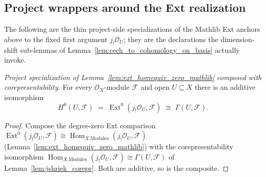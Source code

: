 \subsection{Project wrappers around the Ext realization}

The following are the thin project-side specializations of the Mathlib Ext anchors above to the
fixed first argument \(j_!\mathcal{O}_U\); they are the declarations the dimension-shift sub-lemmas
of Lemma~\ref{lem:cech_to_cohomology_on_basis} actually invoke.

\begin{lemma}\leanok
  \label{lem:absolute_cohomology_zero}
  \textit{Project specialization of Lemma~\ref{lem:ext_homequiv_zero_mathlib} composed with
  corepresentability.}
  For every \(\mathcal{O}_X\)-module \(\mathcal{F}\) and open \(U \subseteq X\) there is an additive
  isomorphism
  \[
    H^0(U, \mathcal{F}) \;=\; \operatorname{Ext}^0(j_!\mathcal{O}_U, \mathcal{F})
      \;\cong\; \Gamma(U, \mathcal{F}).
  \]
\end{lemma}
\begin{proof}
  \leanok
  Compose the degree-zero Ext comparison
  \(\operatorname{Ext}^0(j_!\mathcal{O}_U, \mathcal{F}) \cong
  \operatorname{Hom}_{X.\mathrm{Modules}}(j_!\mathcal{O}_U, \mathcal{F})\)
  (Lemma~\ref{lem:ext_homequiv_zero_mathlib}) with the corepresentability isomorphism
  \(\operatorname{Hom}_{X.\mathrm{Modules}}(j_!\mathcal{O}_U, \mathcal{F}) \cong \Gamma(U,
  \mathcal{F})\) of Lemma~\ref{lem:jshriek_corepr}. Both are additive, so is the composite.
\end{proof}

